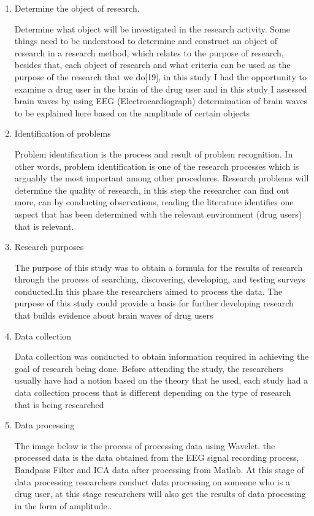 \begin{enumerate}
    \item Determine the object of research.
    \par
   Determine what object will be investigated in the research activity. Some things need to be understood to determine and construct an object of research in a research method, which relates to the purpose of research, besides that, each object of research and what criteria can be used as the purpose of the research that we do[19], in this study I had the opportunity to examine a drug user in the brain of the drug user and in this study I assessed brain waves by using EEG (Electrocardiograph) determination of brain waves to be explained here based on the amplitude of certain objects
   
    \item Identification of problems
    \par
   Problem identification is the process and result of problem recognition. In other words, problem identification is one of the research processes which is arguably the most important among other procedures. Research problems will determine the quality of research, in this step the researcher can find out more, can by conducting observations, reading the literature identifies one aspect that has been determined with the relevant environment (drug users) that is relevant.\cite{chappell2018constructing}
   
    \item Research purposes
    \par
    The purpose of this study was to obtain a formula for the results of research through the process of searching, discovering, developing, and testing surveys conducted.In this phase the researchers aimed to process the data. The purpose of this study could provide a basis for further developing research that builds evidence about brain waves of drug users\cite{chappell2018constructing}

    \item Data collection
    \par
    Data collection was conducted to obtain information required in achieving the goal of research being done. Before attending the study, the researchers usually have had a notion based on the theory that he used, each study had a data collection process that is different depending on the type of research that is being researched
    
    \item Data processing
    \par
 The image below is the process of processing data using Wavelet. the processed data is the data obtained from the EEG signal recording process, Bandpass Filter and ICA data after processing from Matlab. At this stage of data processing researchers conduct data processing on someone who is a drug user, at this stage researchers will also get the results of data processing in the form of amplitude..	
  

\end{enumerate}
